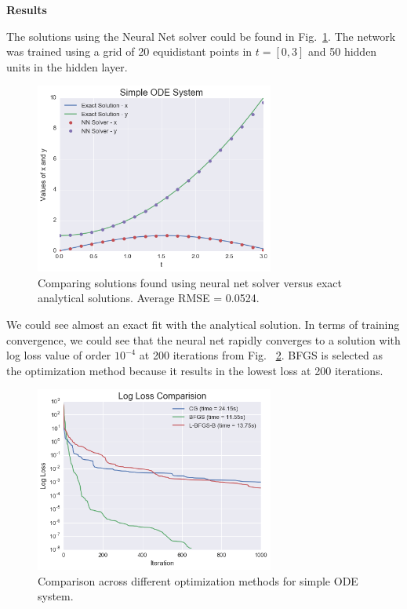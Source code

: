 \documentclass[11pt]{article}
\begin{document}
\textbf{Results}

The solutions using the Neural Net solver could be found in Fig.~\ref{fig:SimpleFig}. The network was trained using a grid of 20 equidistant points in $t = [0, 3]$ and 50 hidden units in the hidden layer. 

\begin{figure}
\centering
\includegraphics[width=0.7\textwidth]{result_simple.png}
      \caption{Comparing solutions found using neural net solver versus exact analytical solutions. Average RMSE = 0.0524. \label{fig:SimpleFig}}
\end{figure}

We could see almost an exact fit with the analytical solution. In terms of training convergence, we could see that the neural net rapidly converges to a solution with log loss value of order $10^{-4}$ at 200 iterations from Fig. ~\ref{fig:SimpleLoss}. BFGS is selected as the optimization method because it results in the lowest loss at 200 iterations.

\begin{figure}
\centering
\includegraphics[width=0.7\textwidth]{loss_simple.png}
      \caption{Comparison across different optimization methods for simple ODE system. \label{fig:SimpleLoss}}
\end{figure}
\end{document}
